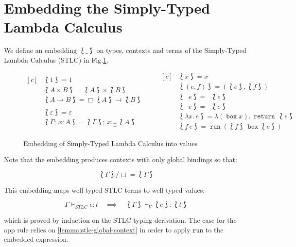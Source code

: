 \documentclass[acmsmall, screen, review, anonymous]{acmart}
\theoremstyle{definition}
\newcommand{\glob}{\mathop{\Box}}
\newcommand{\arr}{\rightarrow}
\newcommand{\fstname}{\mathop{\pi_1}}
\newcommand{\fst}[1]{\fstname #1}
\newcommand{\sndname}{\mathop{\pi_2}}
\newcommand{\snd}[1]{\sndname #1}
\newcommand{\types}{\mathrel{:}}
\newcommand{\gtypes}{\mathrel{:_{\Box}}}
\newcommand{\abs}[2]{\lambda#1.\,#2}
\newcommand{\app}[2]{#1\,#2}
\newcommand{\cempty}{\varepsilon}
\newcommand{\ccons}[2]{#1;\,#2}
\newcommand{\lbind}[3]{\ccons{#1}{#2\types#3}}
\newcommand{\gbind}[3]{\ccons{#1}{#2\gtypes#3}}
\newcommand{\cdiv}[1]{#1/\Box}
\newcommand{\returnname}{\mathop{\mathtt{return}}}
\newcommand{\return}[1]{\returnname\, #1}
\newcommand{\gboxname}{\mathop{\mathtt{box}}}
\newcommand{\gbox}[1]{\gboxname #1}
\newcommand{\grunname}{\mathtt{run}}
\newcommand{\grun}[1]{\mathop{\grunname}(#1)}
\newcommand{\turnv}{\mathrel{\vdash_V}}
\newcommand{\turnstlc}{\mathrel{\vdash_{STLC}}}
\newcommand{\embed}[1]{\mathopen{\lbag}#1\mathclose{\rbag}}
\begin{document}
\section{Embedding the Simply-Typed Lambda Calculus}
\label{apdx:embedding}
We define an embedding $\embed{\_}$ on types, contexts and terms of the
Simply-Typed Lambda Calculus (STLC) in Fig.\ref{fig:stlc}.
\begin{figure}
\begin{equation*}
\begin{aligned}[c]
  &\embed{1} = 1 \\
  &\embed{A \times B} = \embed{A} \times \embed{B} \\
  &\embed{A \rightarrow B} = \glob \embed{A} \arr \embed{B} \\ \\
  &\embed{\cempty} = \cempty \\
  &\embed{\lbind{\Gamma}{x}{A}} = \gbind{\embed{\Gamma}}{x}{\embed{A}}
\end{aligned}
\qquad
\begin{aligned}[c]
  &\embed{x} = x \\
  &\embed{(e, f)} = (\embed{e}, \embed{f}) \\
  &\embed{\fst{e}} = \fst{\embed{e}} \\
  &\embed{\snd{e}} = \snd{\embed{e}} \\
  &\embed{\abs{x}{e}} =
    \abs{(\gbox{x})}{\return{\embed{e}}} \\
  &\embed{\app{f}{e}} = \grun{\app{\embed{f}}{\gbox{\embed{e}}}}
\end{aligned}
\end{equation*}
\caption{Embedding of Simply-Typed Lambda Calculus into values}
\label{fig:stlc}
\end{figure}

Note that the embedding produces contexts with only global bindings so
that:
\begin{lemma}
\label{lemma:stlc-global-context}
  \begin{equation*}
    \cdiv{\embed{\Gamma}} = \embed{\Gamma}
  \end{equation*}
\end{lemma}

This embedding maps well-typed STLC terms to well-typed values:
\begin{lemma}
\label{lemma:stlc-well-typed}
  \begin{equation*}
    \Gamma \turnstlc e \types t
    \quad \implies \quad \embed{\Gamma} \turnv \embed{e} \types \embed{t}
  \end{equation*}
\end{lemma}
which is proved by induction on the STLC typing derivation. The case for
the app rule relies on \ref{lemma:stlc-global-context} in order to apply
$\grunname$ to the embedded expression.
\end{document}
